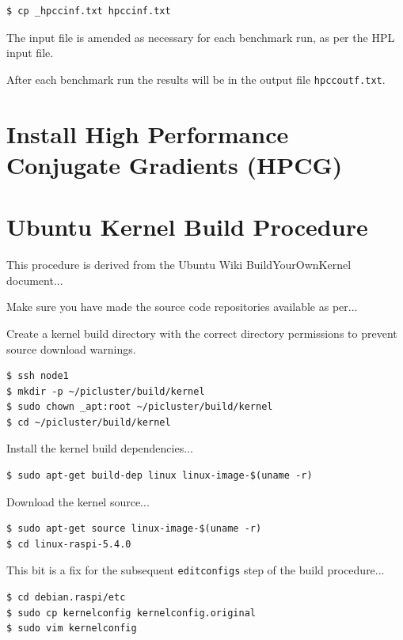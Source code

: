\documentclass{report}
\begin{document}
\lstset{style=type}
\begin{lstlisting}
$ cp _hpccinf.txt hpccinf.txt
\end{lstlisting}

The input file is amended as necessary for each benchmark run, as per the HPL input file.

After each benchmark run the results will be in the output file \verb|hpccoutf.txt|.



%
%
\chapter{Install High Performance Conjugate Gradients (HPCG)}


%
%
\chapter{Ubuntu Kernel Build Procedure}

This procedure is derived from the Ubuntu Wiki BuildYourOwnKernel document...

Make sure you have made the source code repositories available as per...

Create a kernel build directory with the correct directory permissions to prevent source download warnings. 

\lstset{style=type}
\begin{lstlisting}
$ ssh node1
$ mkdir -p ~/picluster/build/kernel
$ sudo chown _apt:root ~/picluster/build/kernel
$ cd ~/picluster/build/kernel
\end{lstlisting}

Install the kernel build dependencies...

\lstset{style=type}
\begin{lstlisting}
$ sudo apt-get build-dep linux linux-image-$(uname -r)
\end{lstlisting}

Download the kernel source...

\lstset{style=type}
\begin{lstlisting}
$ sudo apt-get source linux-image-$(uname -r)
$ cd linux-raspi-5.4.0
\end{lstlisting}

This bit is a fix for the subsequent \verb|editconfigs| step of the build procedure...

\lstset{style=type}
\begin{lstlisting}
$ cd debian.raspi/etc
$ sudo cp kernelconfig kernelconfig.original
$ sudo vim kernelconfig
\end{lstlisting}
\end{document}
